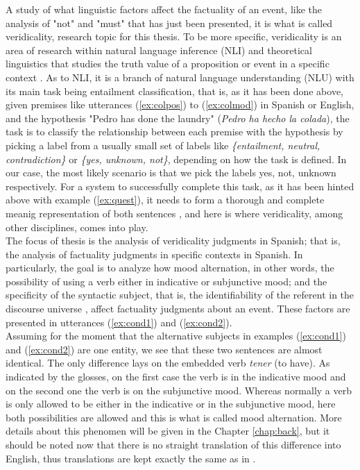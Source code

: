 A study of what linguistic factors affect the factuality of an event, like the analysis of "not" and "must" that has just been presented, it is what is called veridicality, research topic for this thesis. To be more specific, veridicality is an area of research within natural language inference (NLI) and theoretical linguistics that studies the truth value of a proposition or event in a specific context \citep{giannakidou2014non,giannakidou2015mixed}. As to NLI, it is a branch of natural language understanding (NLU) with its main task being entailment classification, that is, as it has been done above, given premises like utterances (\ref{ex:colpos}) to (\ref{ex:colmod}) in Spanish or English, and the hypothesis "Pedro has done the laundry" (\textit{Pedro ha hecho la colada}), the task is to classify the relationship between each premise with the hypothesis by picking a label from a usually small set of labels like \textit{\{entailment, neutral, contradiction\}} \citep{williams2017broad} or \textit{\{yes, unknown, not\}}, depending on how the task is defined. In our case, the most likely scenario is that we pick the labels yes, not, unknown respectively. For a system to successfully complete this task, as it has been hinted above with example (\ref{ex:quest}), it needs to form a thorough and complete meanig representation of both sentences \citep{williams2017broad}, and here is where veridicality, among other disciplines, comes into play.\\ 

The focus of thesis is the analysis of veridicality judgments in Spanish; that is, the analysis of factuality judgments in specific contexts in Spanish. In particularly, the goal is to analyze how mood alternation, in other words, the possibility of using a verb either in indicative or subjunctive mood; and the specificity of the syntactic subject, that is, the identifiability of the referent in the discourse universe \citep{caudet1999expresiones}, affect factuality judgments about an event. These factors are presented in utterances (\ref{ex:cond1}) and (\ref{ex:cond2}).\\

Assuming for the moment that the alternative subjects in examples (\ref{ex:cond1}) and (\ref{ex:cond2}) are one entity, we see that these two sentences are almost identical. The only difference lays on the embedded verb \textit{tener} (to have). As indicated by the glosses, on the first case the verb is in the indicative mood and on the second one the verb is on the subjunctive mood. Whereas normally a verb is only allowed to be either in the indicative or in the subjunctive mood, here both possibilities are allowed and this is what is called mood alternation. More details about this phenomen will be given in the Chapter \ref{chap:back}, but it should be noted now that there is no straight translation of this difference into English, thus translations are kept exactly the same as in \citet{faulkner2021systematic}.\\

